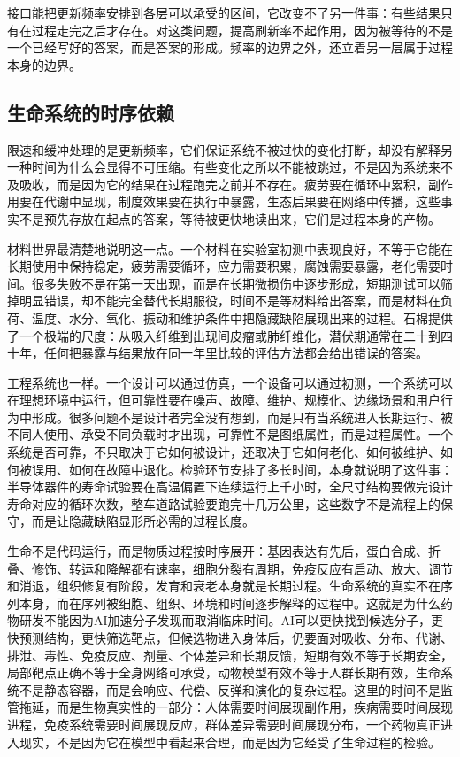 接口能把更新频率安排到各层可以承受的区间，它改变不了另一件事：有些结果只有在过程走完之后才存在。对这类问题，提高刷新率不起作用，因为被等待的不是一个已经写好的答案，而是答案的形成。频率的边界之外，还立着另一层属于过程本身的边界。

\subsection{生命系统的时序依赖}

限速和缓冲处理的是更新频率，它们保证系统不被过快的变化打断，却没有解释另一种时间为什么会显得不可压缩。有些变化之所以不能被跳过，不是因为系统来不及吸收，而是因为它的结果在过程跑完之前并不存在。疲劳要在循环中累积，副作用要在代谢中显现，制度效果要在执行中暴露，生态后果要在网络中传播，这些事实不是预先存放在起点的答案，等待被更快地读出来，它们是过程本身的产物。


材料世界最清楚地说明这一点。一个材料在实验室初测中表现良好，不等于它能在长期使用中保持稳定，疲劳需要循环，应力需要积累，腐蚀需要暴露，老化需要时间。很多失败不是在第一天出现，而是在长期微损伤中逐步形成，短期测试可以筛掉明显错误，却不能完全替代长期服役，时间不是等材料给出答案，而是材料在负荷、温度、水分、氧化、振动和维护条件中把隐藏缺陷展现出来的过程。石棉提供了一个极端的尺度：从吸入纤维到出现间皮瘤或肺纤维化，潜伏期通常在二十到四十年，任何把暴露与结果放在同一年里比较的评估方法都会给出错误的答案。

工程系统也一样。一个设计可以通过仿真，一个设备可以通过初测，一个系统可以在理想环境中运行，但可靠性要在噪声、故障、维护、规模化、边缘场景和用户行为中形成。很多问题不是设计者完全没有想到，而是只有当系统进入长期运行、被不同人使用、承受不同负载时才出现，可靠性不是图纸属性，而是过程属性。一个系统是否可靠，不只取决于它如何被设计，还取决于它如何老化、如何被维护、如何被误用、如何在故障中退化。检验环节安排了多长时间，本身就说明了这件事：半导体器件的寿命试验要在高温偏置下连续运行上千小时，全尺寸结构要做完设计寿命对应的循环次数，整车道路试验要跑完十几万公里，这些数字不是流程上的保守，而是让隐藏缺陷显形所必需的过程长度。

生命不是代码运行，而是物质过程按时序展开：基因表达有先后，蛋白合成、折叠、修饰、转运和降解都有速率，细胞分裂有周期，免疫反应有启动、放大、调节和消退，组织修复有阶段，发育和衰老本身就是长期过程。生命系统的真实不在序列本身，而在序列被细胞、组织、环境和时间逐步解释的过程中。这就是为什么药物研发不能因为AI加速分子发现而取消临床时间。AI可以更快找到候选分子，更快预测结构，更快筛选靶点，但候选物进入身体后，仍要面对吸收、分布、代谢、排泄、毒性、免疫反应、剂量、个体差异和长期反馈，短期有效不等于长期安全，局部靶点正确不等于全身网络可承受，动物模型有效不等于人群长期有效，生命系统不是静态容器，而是会响应、代偿、反弹和演化的复杂过程。这里的时间不是监管拖延，而是生物真实性的一部分：人体需要时间展现副作用，疾病需要时间展现进程，免疫系统需要时间展现反应，群体差异需要时间展现分布，一个药物真正进入现实，不是因为它在模型中看起来合理，而是因为它经受了生命过程的检验。

